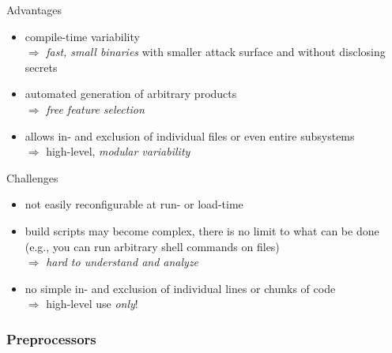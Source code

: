 \begin{frame}{\myframetitle}
	\begin{mycolumns}
		\begin{note}{Advantages}
			\begin{itemize}
				\item compile-time variability\\
					$\Rightarrow$ \emph{fast, small binaries} with smaller attack surface and without disclosing secrets
				\item automated generation of arbitrary products\\
					$\Rightarrow$ \emph{free feature selection}
				\item allows in- and exclusion of individual files or even entire subsystems\\
					$\Rightarrow$ high-level, \emph{modular variability}
			\end{itemize}
		\end{note}
	\mynextcolumn
		\begin{note}{Challenges}
			\begin{itemize}
				\item not easily reconfigurable at run- or load-time
				\item build scripts may become complex, there is no limit to what can be done (e.g., you can run arbitrary shell commands on files)\\
					$\Rightarrow$ \emph{hard to understand and analyze}
				\item no simple in- and exclusion of individual lines or chunks of code\\
				$\Rightarrow$ high-level use \emph{only}!
			\end{itemize}
		\end{note}
	\end{mycolumns}
\end{frame}


\subsubsection*{Preprocessors}

